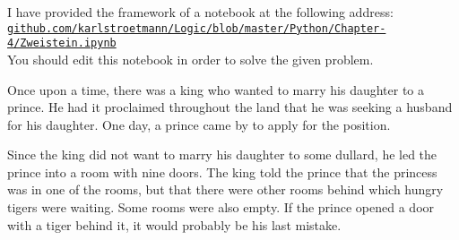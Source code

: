 \noindent
I have provided the framework of a notebook at the following address:
\\[0.2cm]
\hspace*{1.3cm}
\href{https://github.com/karlstroetmann/Logic/blob/master/Python/Chapter-4/Zweistein.ipynb}{\texttt{github.com/karlstroetmann/Logic/blob/master/Python/Chapter-4/Zweistein.ipynb}}
\\[0.2cm]
You should edit this notebook in order to solve the given problem.

\exerciseEng
Once upon a time, there was a king who wanted to marry his daughter to a
prince. He had it proclaimed throughout the land that he was seeking a husband
for his daughter. One day, a prince came by to apply for the position. 

Since the king did not want to marry his daughter to some dullard, he led the
prince into a room with nine doors. The king told the prince that the princess
was in one of the rooms, but that there were other rooms behind which hungry
tigers were waiting. Some rooms were also empty. If the prince opened a door
with a tiger behind it, it would probably be his last mistake. 

